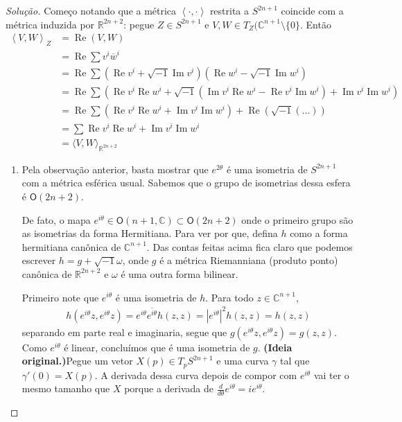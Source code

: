 \begin{proof}[Solução]\leavevmode
	Começo notando que a métrica \(\left<\cdot,\cdot\right>\) restrita a \(S^{2n+1}\) coincide com a métrica induzida por \(\mathbb{R}^{2n+2}\): pegue \(Z \in S^{2n+1}\) e \(V,W \in T_Z(\mathbb{C}^{n+1}\setminus\{0\}\). Então
	\begin{align*}
\left<V,W\right>_Z&=\operatorname{Re}( V,W)\\ &= \operatorname{Re}\sum v^i\overline{w}^i \\
&= \operatorname{Re}\sum \left(\operatorname{Re} v^i + \sqrt{-1}\operatorname{Im} v^i\right)\left(\operatorname{Re} w^i - \sqrt{-1} \operatorname{Im} w^i\right) \\
&= \operatorname{Re}\sum\left(\operatorname{Re} v^i\operatorname{Re} w^i + \sqrt{-1}(\operatorname{Im} v^i\operatorname{Re} w^i-\operatorname{Re} v^i\operatorname{Im} w^i ) + \operatorname{Im} v^i\operatorname{Im} w^i\right) \\
&= \operatorname{Re}\sum\left(\operatorname{Re} v^i\operatorname{Re} w^i + \operatorname{Im} v^i\operatorname{Im} w^i\right) + \operatorname{Re}\left(\sqrt{-1}(\dots)\right) \\
&= \sum \operatorname{Re} v^i\operatorname{Re} w^i + \operatorname{Im} v^i\operatorname{Im} w^i \\
&= \langle V,W\rangle_{\mathbb{R}^{2n+2}}
\end{align*}
\begin{enumerate}[label=(\alph*)]
\item Pela observação anterior, basta mostrar que \(e^{2\theta}\) é uma isometria de \(S^{2n+1}\) com a métrica esférica usual. Sabemos que o grupo de isometrias dessa esfera é \(\mathsf{O}(2n+2)\).

	De fato, o mapa \(e^{i\theta} \in \mathsf{O}(n+1,\mathbb{C})\subset\mathsf{O}(2n+2)\) onde o primeiro grupo são as isometrias da forma Hermitiana. Para ver por que, defina \(h\) como a forma hermitiana canônica de \(\mathbb{C}^{n+1}\). Das contas feitas acima fica claro que podemos escrever \(h=g+\sqrt{-1}\omega\), onde \(g\) é a métrica Riemanniana (produto ponto) canônica de \(\mathbb{R}^{2n+2}\) e \(\omega\) é uma outra forma bilinear.

Primeiro note que \(e^{i\theta}\) é uma isometria de \(h\). Para todo \(z \in \mathbb{C}^{n+1}\),
\begin{align*}
h(e^{i\theta}z,e^{i\theta}z)=e^{i\theta}\overline{e^{i\theta}}h(z,z)=|e^{i\theta}|^2h(z,z)=h(z,z)
\end{align*}
separando em parte real e imaginaria, segue que \(g(e^{i\theta}z,e^{i\theta}z)=g(z,z)\). Como \(e^{i\theta}\) é linear, concluímos que é uma isometria de \(g\).
\iffalse
	\textbf{(Ideia original.)}Pegue um vetor \(X(p) \in T_pS^{2n+1}\) e uma curva \(\gamma\) tal que \(\gamma'(0)=X(p)\). A derivada dessa curva depois de compor com \(e^{i\theta}\) vai ter o mesmo tamanho que \(X\) porque a derivada de \(\frac{d}{d\theta}e^{i\theta}=ie^{i\theta}\).


\end{enumerate}
\end{proof}

